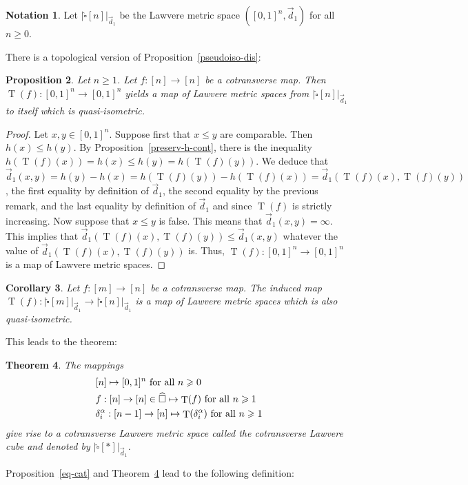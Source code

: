 \documentclass[a4paper,12pt]{amsart}
\renewcommand{\vec}{\overrightarrow}
\newtheorem{thm}{Theorem}[section]
\newtheorem{prop}[thm]{Proposition}
\newtheorem{cor}[thm]{Corollary}
\newcommand{\bp}{\begin{prop}}
\newcommand{\ep}{\end{prop}}
\newcommand{\bth}{\begin{thm}}
\renewcommand{\eth}{\end{thm}}
\newcommand{\bpf}{\begin{proof}}
\newcommand{\epf}{\end{proof}}
\theoremstyle{definition}
\newtheorem{nota}[thm]{Notation}
\renewcommand{\leq}{\leqslant}
\renewcommand{\geq}{\geqslant}
\newcommand{\vd}{\vec{d}\!_1}
\DeclareMathOperator{\TT}{T}
\begin{document}
\begin{nota}
	Let $|\widehat{\square}[n]|_{\vd}$ be the Lawvere metric space $([0,1]^n,\vd)$ for all $n\geq 0$. 
\end{nota}

There is a topological version of Proposition~\ref{pseudoiso-dis}: 

\bp \label{pseudoiso-cont}
Let $n\geq 1$. Let $f:[n]\to [n]$ be a cotransverse map. Then $\TT(f):[0,1]^n\to [0,1]^n$ yields a map of Lawvere metric spaces from $|\widehat{\square}[n]|_{\vd}$ to itself which is quasi-isometric. 
\ep

\bpf
Let $x,y\in [0,1]^n$. Suppose first that $x \leq y$ are comparable. Then $h(x)\leq h(y)$. By Proposition~\ref{preserv-h-cont}, there is the inequality $h(\TT(f)(x)) = h(x) \leq h(y) = h(\TT(f)(y))$. We deduce that $\vd(x,y)=h(y)-h(x)=h(\TT(f)(y))-h(\TT(f)(x))=\vd(\TT(f)(x),\TT(f)(y))$, the first equality by definition of $\vd$, the second equality by the previous remark, and the last equality by definition of $\vd$ and since $\TT(f)$ is strictly increasing. Now suppose that $x\leq y$ is false. This means that $\vd(x,y)=\infty$. This implies that $\vd(\TT(f)(x),\TT(f)(y))\leq \vd(x,y)$ whatever the value of $\vd(\TT(f)(x),\TT(f)(y))$ is. Thus, $\TT(f):[0,1]^n\to [0,1]^n$ is a map of Lawvere metric spaces. 
\epf

\begin{cor} \label{quasi-isometric}
	Let $f:[m]\to [n]$ be a cotransverse map. The induced map $\TT(f):|\widehat{\square}[m]|_{\vd} \to |\widehat{\square}[n]|_{\vd}$ is a map of Lawvere metric spaces which is also quasi-isometric.
\end{cor}

This leads to the theorem: 

\bth \label{cotransverse-Lawverecube}
The mappings 
\begin{align*}
	&[n]\mapsto [0,1]^n \hbox{ for all } n\geq 0\\
	&f:[n]\to [n]\in \widehat{\square} \mapsto \TT(f) \hbox{ for all } n\geq 1\\
	&\delta_i^\alpha:[n-1]\to [n] \mapsto \TT(\delta_i^\alpha)\hbox{ for all } n\geq 1
\end{align*}
give rise to a cotransverse Lawvere metric space called the \textit{cotransverse Lawvere cube} and denoted by $|\widehat{\square}[*]|_{\vd}$.
\eth

Proposition~\ref{eq-cat} and Theorem~\ref{cotransverse-Lawverecube} lead to the following definition:
\end{document}
